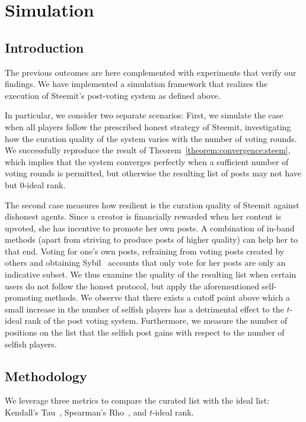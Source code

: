 \section{Simulation}
  \subsection{Introduction}
    The previous outcomes are here complemented with experiments that verify our
    findings. We have implemented a simulation framework that realizes the
    execution of Steemit's post-voting system as defined above.

    In particular, we consider two separate scenarios: First, we simulate the
    case when all players follow the prescribed honest strategy of Steemit,
    investigating how the curation quality of the system varies with the number
    of voting rounds. We successfully reproduce the result of
    Theorem~\ref{theorem:convergence:steem}, which implies that the system
    converges perfectly when a sufficient number of voting rounds is permitted,
    but otherwise the resulting list of posts may not have but 0-ideal rank.

    The second case measures how resilient is the curation quality of Steemit
    against dishonest agents. Since a creator is financially rewarded when her
    content is upvoted, she has incentive to promote her own posts. A
    combination of in-band methods (apart from striving to produce posts of
    higher quality) can help her to that end. Voting for one's own posts,
    refraining from voting posts created by others and obtaining
    Sybil~\cite{sybilattack} accounts that only vote for her posts are only an
    indicative subset. We thus examine the quality of the resulting list when
    certain users do not follow the honest protocol, but apply the
    aforementioned self-promoting methods. We observe that there exists a cutoff
    point above which a small increase in the number of selfish players has a
    detrimental effect to the $t$-ideal rank of the post voting system.
    Furthermore, we measure the number of positions on the list that the selfish
    post gains with respect to the number of selfish players.

  \subsection{Methodology}
    We leverage three metrics to compare the curated list with the ideal list:
    Kendall's Tau~\cite{kendall1955rank}, Spearman's
    Rho~\cite{spearman1904proof}, and $t$-ideal rank.

